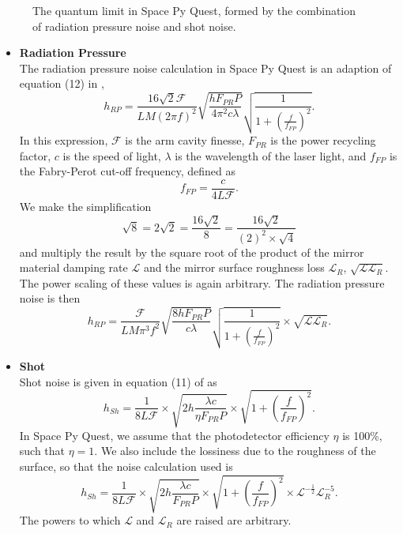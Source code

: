 \documentclass{article}
\begin{document}
\begin{itemize}
\begin{figure}[h!]
    \caption{The quantum limit in Space Py Quest, formed by the combination of radiation pressure noise and shot noise.}
    \label{fig:quantum}
    \end{figure}
    \begin{itemize}
        \item \textbf{Radiation Pressure} \\
    The radiation pressure noise calculation in Space Py Quest is an
    adaption of equation (12) in \cite{VIRGO}, 
    \[
    h_{RP} = \frac{16\sqrt{2}\mathcal{F}}{LM(2\pi f)^2}\sqrt{\frac{hF_{PR}P}{4\pi^2c\lambda}}\sqrt{\frac{1}{1 + \left(\frac{f}{f_{FP}}\right)^2}}.
    \]
    In this expression, $\mathcal{F}$ is the arm cavity finesse,
    $F_{PR}$ is the power recycling factor, $c$ is the speed of light,
    $\lambda$ is the wavelength of the laser light, and $f_{FP}$ is
    the Fabry-Perot cut-off frequency, defined as
    \begin{equation}
        f_{FP} = \frac{c}{4L\mathcal{F}}.
    \end{equation}
    We make the simplification
    \[
    \sqrt{8} = 2\sqrt{2} = \frac{16 \sqrt{2}}{8} = \frac{16 \sqrt{2}}{(2)^2 \times \sqrt{4}}
    \]
   and multiply the result by the square root of the product of the
   mirror material damping rate $\mathcal{L}$ and the mirror surface
   roughness loss $\mathcal{L}_R$,
   $\sqrt{\mathcal{L}\mathcal{L}_R}$. The power scaling of these
   values is again arbitrary. The radiation pressure noise is then
    \begin{equation}
    \label{eqn::radiation}
    h_{RP} = \frac{\mathcal{F}}{LM\pi^3f^2}\sqrt{\frac{8hF_{PR}P}{c\lambda}}\sqrt{\frac{1}{1 + \left(\frac{f}{f_{FP}}\right)^2}} \times \sqrt{\mathcal{L}\mathcal{L}_R}.
    \end{equation}
  
    \item \textbf{Shot} \\
    Shot noise is given in equation (11) of \cite{VIRGO} as
    \begin{equation}
    h_{Sh} = \frac{1}{8L\mathcal{F}}\times\sqrt{2h\frac{\lambda c}{\eta F_{PR}P}}\times\sqrt{1 + \left(\frac{f}{f_{FP}}\right)^2}.
    \end{equation}
    In Space Py Quest, we assume that the photodetector efficiency
    $\eta$ is 100\%, such that $\eta = 1$. We also include the
    lossiness due to the roughness of the surface, so that the noise
    calculation used is
    \begin{equation}
    \label{eqn::shot}
    h_{Sh} = \frac{1}{8L\mathcal{F}}\times\sqrt{2h\frac{\lambda c}{F_{PR}P}}\times\sqrt{1 + \left(\frac{f}{f_{FP}}\right)^2}\times\mathcal{L}^{-\frac{1}{2}}\mathcal{L}_R^{-5}.
    \end{equation}
    The powers to which $\mathcal{L}$ and $\mathcal{L}_R$ are raised are arbitrary.
    \end{itemize}
\end{itemize}
\end{document}
